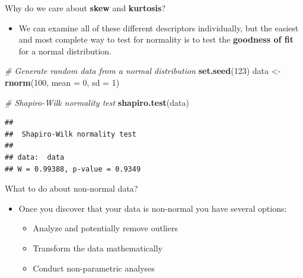 \documentclass[
  ignorenonframetext,
]{beamer}
\newenvironment{Shaded}{\begin{snugshade}}{\end{snugshade}}
\newcommand{\AttributeTok}[1]{\textcolor[rgb]{0.13,0.29,0.53}{#1}}
\newcommand{\CommentTok}[1]{\textcolor[rgb]{0.56,0.35,0.01}{\textit{#1}}}
\newcommand{\DecValTok}[1]{\textcolor[rgb]{0.00,0.00,0.81}{#1}}
\newcommand{\FunctionTok}[1]{\textcolor[rgb]{0.13,0.29,0.53}{\textbf{#1}}}
\newcommand{\NormalTok}[1]{#1}
\newcommand{\OtherTok}[1]{\textcolor[rgb]{0.56,0.35,0.01}{#1}}
\providecommand{\tightlist}{%
  \setlength{\itemsep}{0pt}\setlength{\parskip}{0pt}}
\begin{document}
\begin{frame}[fragile]{Why do we care about \textbf{skew} and
\textbf{kurtosis}?}
\label{why-do-we-care-about-skew-and-kurtosis-1}
\begin{itemize}
\tightlist
\item
  We can examine all of these different descriptors individually, but
  the easiest and most complete way to test for normality is to test the
  \textbf{goodness of fit} for a normal distribution.
\end{itemize}

\begin{Shaded}
\begin{Highlighting}[]
\CommentTok{\# Generate random data from a normal distribution}
\FunctionTok{set.seed}\NormalTok{(}\DecValTok{123}\NormalTok{)}
\NormalTok{data }\OtherTok{\textless{}{-}} \FunctionTok{rnorm}\NormalTok{(}\DecValTok{100}\NormalTok{, }\AttributeTok{mean =} \DecValTok{0}\NormalTok{, }\AttributeTok{sd =} \DecValTok{1}\NormalTok{)}

\CommentTok{\# Shapiro{-}Wilk normality test}
\FunctionTok{shapiro.test}\NormalTok{(data)}
\end{Highlighting}
\end{Shaded}

\begin{verbatim}
## 
##  Shapiro-Wilk normality test
## 
## data:  data
## W = 0.99388, p-value = 0.9349
\end{verbatim}
\end{frame}

\begin{frame}{What to do about non-normal data?}
\label{what-to-do-about-non-normal-data}
\begin{itemize}
\item
  Once you discover that your data is non-normal you have several
  options:

  \begin{itemize}
  \tightlist
  \item
    Analyze and potentially remove outliers
  \item
    Transform the data mathematically
  \item
    Conduct non-parametric analyses
  \end{itemize}
\end{itemize}
\end{frame}
\end{document}
